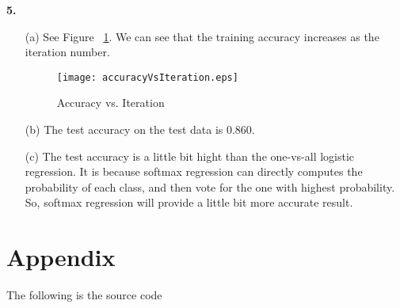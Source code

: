 \documentclass[12pt]{article} %
\theoremstyle{definition}\newtheorem{law}{Law}
\theoremstyle{plain}\newtheorem{jury}[law]{Jury}
\theoremstyle{remark}\newtheorem{juu}{Juu}
\theoremstyle{definition}\newtheorem{kuu}[law]{Kuu}
\theoremstyle{definition}\newtheorem{muu}{Muu}[section]
\theoremstyle{definition}\newtheorem{honoluu}{Honoluu}[section]
\theoremstyle{definition}\newtheorem{konoluu}[muu]{Konoluu}
\begin{document}
{\bf 5.}
\begin{enumerate}
\item[(a)]
See Figure ~\ref{fig:accuracyVsIte}. We can see that the training accuracy increases as the iteration number.

\begin{figure}[ht]
\centering
\texttt{[image: accuracyVsIteration.eps]}
\caption{Accuracy vs. Iteration}
\label{fig:accuracyVsIte}
\end{figure}

\item[(b)]
The test accuracy on the test data is 0.860.

\item[(c)]
The test accuracy is a little bit hight than the one-vs-all logistic regression. It is because softmax regression can directly computes the probability of each class, and then vote for the one with highest probability. So, softmax regression will provide a little bit more accurate result. 
\end{enumerate}



\newpage
\section{Appendix}
The following is the  source code\\
\end{document}
